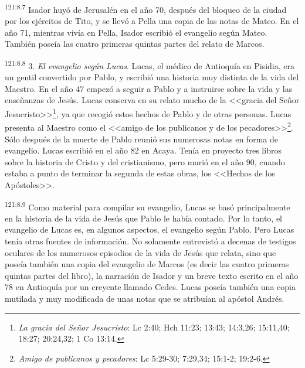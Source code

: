 \par 
\textsuperscript{121:8.7} Isador huyó de Jerusalén en el año 70, después del bloqueo de la ciudad por los ejércitos de Tito, y se llevó a Pella una copia de las notas de Mateo. En el año 71, mientras vivía en Pella, Isador escribió el evangelio según Mateo. También poseía las cuatro primeras quintas partes del relato de Marcos.

\par 
\textsuperscript{121:8.8} 3. \textit{El evangelio según Lucas}. Lucas, el médico de Antioquía en Pisidia, era un gentil convertido por Pablo, y escribió una historia muy distinta de la vida del Maestro. En el año 47 empezó a seguir a Pablo y a instruirse sobre la vida y las enseñanzas de Jesús. Lucas conserva en su relato mucho de la <<gracia del Señor Jesucristo>>\footnote{\textit{La gracia del Señor Jesucristo}: Lc 2:40; Hch 11:23; 13:43; 14:3,26; 15:11,40; 18:27; 20:24,32; 1 Co 13:14.}, ya que recogió estos hechos de Pablo y de otras personas. Lucas presenta al Maestro como el <<amigo de los publicanos y de los pecadores>>\footnote{\textit{Amigo de publicanos y pecadores}: Lc 5:29-30; 7:29,34; 15:1-2; 19:2-6.}. Sólo después de la muerte de Pablo reunió sus numerosas notas en forma de evangelio. Lucas escribió en el año 82 en Acaya. Tenía en proyecto tres libros sobre la historia de Cristo y del cristianismo, pero murió en el año 90, cuando estaba a punto de terminar la segunda de estas obras, los <<Hechos de los Apóstoles>>.

\par 
\textsuperscript{121:8.9} Como material para compilar su evangelio, Lucas se basó principalmente en la historia de la vida de Jesús que Pablo le había contado. Por lo tanto, el evangelio de Lucas es, en algunos aspectos, el evangelio según Pablo. Pero Lucas tenía otras fuentes de información. No solamente entrevistó a decenas de testigos oculares de los numerosos episodios de la vida de Jesús que relata, sino que poseía también una copia del evangelio de Marcos (es decir las cuatro primeras quintas partes del libro), la narración de Isador y un breve texto escrito en el año 78 en Antioquía por un creyente llamado Cedes. Lucas poseía también una copia mutilada y muy modificada de unas notas que se atribuían al apóstol Andrés.

